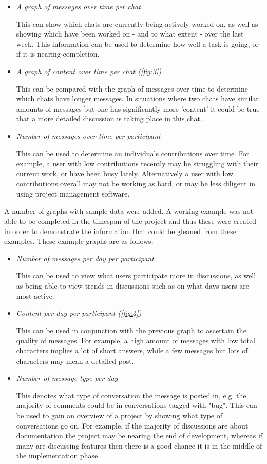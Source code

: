 \documentclass{l4proj}
\begin{document}
\begin{itemize}
\item \textit{A graph of messages over time per chat}
\par This can show which chats are currently being actively worked on, as well as showing which have been worked on - and to what extent - over the last week.  This information can be used to determine how well a task is going, or if it is nearing completion.
\item \textit{A graph of content over time per chat (\ref{fig:3})}
\par This can be compared with the graph of messages over time to determine which chats have longer messages.  In situations where two chats have similar amounts of messages but one has significantly more 'content' it could be true that a more detailed discussion is taking place in this chat.
\item \textit{Number of messages over time per participant}
\par This can be used to determine an individuals contributions over time.  For example, a user with low contributions recently may be struggling with their current work, or have been busy lately. Alternatively a user with low contributions overall may not be working as hard, or may be less diligent in using project management software.

\end{itemize}



\newpage


A number of graphs with sample data were added.  A working example was not able to be completed in the timespan of the project and thus these were created in order to demonstrate the information that could be gleaned from these examples.  These example graphs are as follows:

\begin{itemize}
\item \textit{Number of messages per day per participant}
\par This can be used to view what users participate more in discussions, as well as being able to view trends in discussions such as on what days users are most active.
\item \textit{Content per day per participant (\ref{fig:4})}
\par This can be used in conjunction with the previous graph to ascertain the quality of messages.  For example, a high amount of messages with low total characters implies a lot of short answers, while a few messages but lots of characters may mean a detailed post.\item \textit{Number of message type per day}
\par This denotes what type of conversation the message is posted in, e.g. the majority of comments could be in conversations tagged with "bug".  This can be used to gain an overview of a project by showing what type of conversations go on.  For example, if the majority of discussions are about documentation the project may be nearing the end of development, whereas if many are discussing features then there is a good chance it is in the middle of the implementation phase.
\end{itemize}
\end{document}
